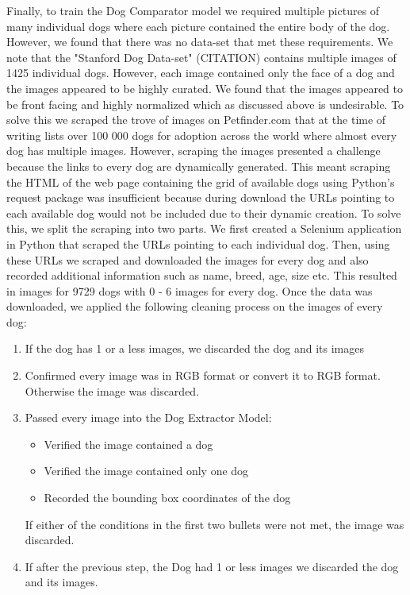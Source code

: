 \documentclass{article}
\begin{document}
Finally, to train the Dog Comparator model we required multiple pictures of many individual dogs where each picture contained the entire body of the dog.  However, we found that there was no data-set that met these requirements.  We note that the "Stanford Dog Data-set" (CITATION) contains multiple images of 1425 individual dogs.  However, each image contained only the face of a dog and the images appeared to be highly curated.  We found that the images appeared to be front facing and highly normalized which as discussed above is undesirable.  To solve this we scraped the trove of images on Petfinder.com that at the time of writing lists over 100 000 dogs for adoption across the world where almost every dog has multiple images.  However, scraping the images presented a challenge because the links to every dog are dynamically generated.  This meant scraping the HTML of the web page containing the grid of available dogs using Python's request package was insufficient because during download the URLs pointing to each available dog would not be included due to their dynamic creation.  To solve this, we split the scraping into two parts.  We first created a Selenium application in Python that scraped the URLs pointing to each individual dog.  Then, using these URLs we scraped and downloaded the images for every dog and also recorded additional information such as name, breed, age, size etc.  This resulted in images for 9729 dogs with 0 - 6 images for every dog.  Once the data was downloaded, we applied the following cleaning process on the images of every dog:
\begin{enumerate}
  
  \item If the dog has 1 or a less images, we discarded the dog and its images
  
  \item Confirmed every image was in RGB format or convert it to RGB format.  Otherwise the image was discarded.
  
  \item Passed every image into the Dog Extractor Model:
    \begin{itemize}
      \item Verified the image contained a dog
      \item Verified the image contained only one dog
      \item Recorded the bounding box coordinates of the dog
    \end{itemize}
    If either of the conditions in the first two bullets were not met, the image was discarded.
    
  \item If after the previous step, the Dog had 1 or less images we discarded the dog and its images.
  
\end{enumerate}
\end{document}

